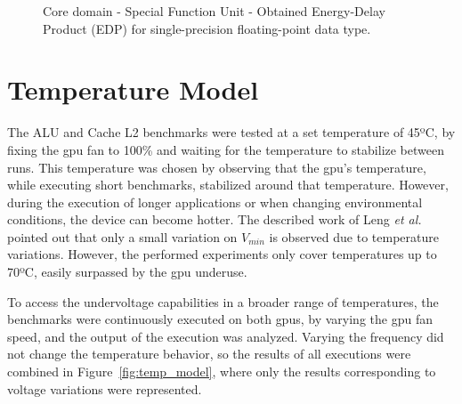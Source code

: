 \begin{figure}[!htb]
    \centering
    \begin{subfigmatrix}{2}
      \label{fig:SFU_EDP}
    \end{subfigmatrix}
    \caption{Core domain - Special Function Unit - Obtained Energy-Delay Product (EDP) for single-precision floating-point data type.}
\end{figure}

\section{Temperature Model}
\label{sec:temp_model}

The ALU and Cache L2 benchmarks were tested at a set temperature of 45ºC, by fixing the \acrshort{gpu} fan to 100\% and waiting for the temperature to stabilize between runs. This temperature was chosen by observing that the  \acrshort{gpu}'s temperature, while executing short benchmarks, stabilized around that temperature. However, during the execution of longer applications or when changing environmental conditions, the device can become hotter. The described work of Leng \textit{et al.}~\cite{leng_safe_2015} pointed out that only a small variation on $V_{min}$ is observed due to temperature variations. However, the performed experiments only cover temperatures up to 70ºC, easily surpassed by the \acrshort{gpu} underuse. 

To access the undervoltage capabilities in a broader range of temperatures, the benchmarks were continuously executed on both \acrshort{gpu}s, by varying the \acrshort{gpu} fan speed, and the output of the execution was analyzed. Varying the frequency did not change the temperature behavior, so the results of all executions were combined in Figure~\ref{fig:temp_model}, where only the results corresponding to voltage variations were represented. 

